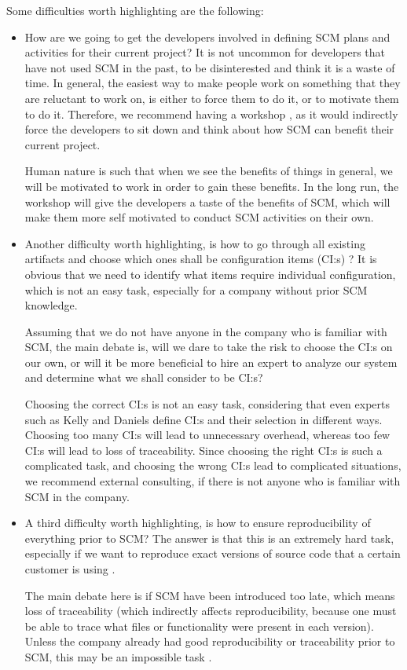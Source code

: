 \documentclass[10pt]{article}
\begin{document}
Some difficulties worth highlighting are the following:
\begin{itemize}
\item How are we going to get the developers involved in defining SCM plans and activities for their current project? It is not uncommon for developers that have not used SCM in the past, to be disinterested and think it is a waste of time. In general, the easiest way to make people work on something that they are reluctant to work on, is either to force them to do it, or to motivate them to do it. Therefore, we recommend having a workshop \cite{Vinter}, as it would indirectly force the developers to sit down and think about how SCM can benefit their current project. 

\noindent Human nature is such that when we see the benefits of things in general, we will be motivated to work in order to gain these benefits. In the long run, the workshop will give the developers a taste of the benefits of SCM, which will make them more self motivated to conduct SCM activities on their own. 

\item Another difficulty worth highlighting, is how to go through all existing artifacts and choose which ones shall be configuration items (CI:s) \cite{Kelly2}? It is obvious that we need to identify what items require individual configuration, which is not an easy task, especially for a company without prior SCM knowledge. 

\noindent Assuming that we do not have anyone in the company who is familiar with SCM, the main debate is, will we dare to take the risk to choose the CI:s on our own, or will it be more beneficial to hire an expert to analyze our system and determine what we shall consider to be CI:s? 

Choosing the correct CI:s is not an easy task, considering that even experts such as Kelly\cite{Kelly2} and Daniels\cite{Daniels3} define CI:s and their selection in different ways. Choosing too many CI:s will lead to unnecessary overhead, whereas too few CI:s will lead to loss of traceability\cite{Daniels3}. Since choosing the right CI:s is such a complicated task\cite{Daniels3}\cite{Kelly2}, and choosing the wrong CI:s lead to complicated situations\cite{Daniels3}, we recommend external consulting, if there is not anyone who is familiar with SCM in the company.

\item A third difficulty worth highlighting, is how to ensure reproducibility of everything prior to SCM? The answer is that this is an extremely hard task, especially if we want to reproduce exact versions of source code that a certain customer is using \cite{Appleton2}.

\noindent The main debate here is if SCM have been introduced too late, which means loss of traceability \cite{Kelly} (which indirectly affects reproducibility, because one must be able to trace what files or functionality were present in each version). Unless the company already had good reproducibility or traceability prior to SCM, this may be an impossible task \cite{Bays}. 

\end{itemize}
\end{document}
